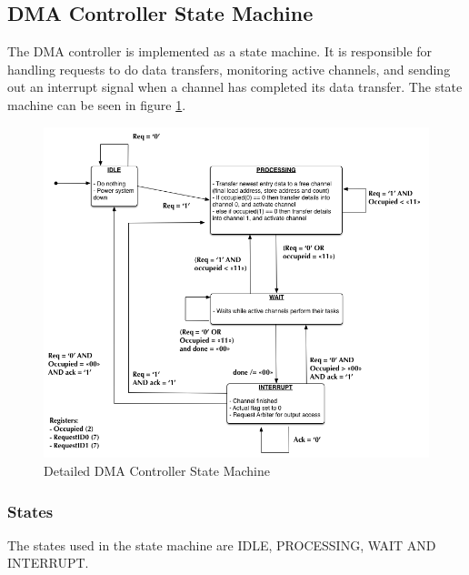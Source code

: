 \begin{appendix}
\subsection{DMA Controller State Machine}

The DMA controller is implemented as a state machine.
It is responsible for handling requests to do data transfers, monitoring active channels, and sending out an interrupt signal when a channel has completed its data transfer.
The state machine can be seen in figure \ref{fig:DMAControllerStateMachine}.

\begin{figure}[htb]
    \centering
    \includegraphics[width=1\textwidth]{Figures/DMA/StateMachineFinal}
    \caption{Detailed DMA Controller State Machine}
    \label{fig:DMAControllerStateMachine}
\end{figure}

\subsubsection{States}
The states used in the state machine are IDLE, PROCESSING, WAIT AND INTERRUPT.


\end{appendix}
